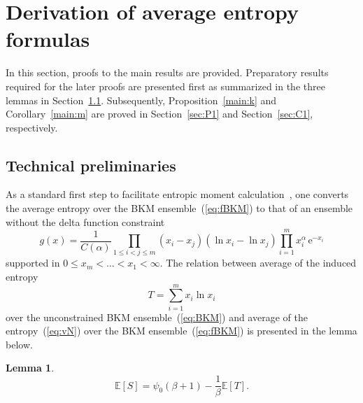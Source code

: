 \documentclass[pdflatex,sn-mathphys-num]{sn-jnl}%
\theoremstyle{thmstyleone}
\newtheorem{lemma}{Lemma}
\newcommand{\ee}{\,\mathrm{e}}
\begin{document}
\section{Derivation of average entropy formulas}\label{sec:proof}
In this section, proofs to the main results are provided. Preparatory results required for the later proofs are presented first as summarized in the three lemmas in Section~\ref{sec:aux}. Subsequently, Proposition~\ref{main:k} and Corollary~\ref{main:m} are proved in Section~\ref{sec:P1} and Section~\ref{sec:C1}, respectively.

\subsection{Technical preliminaries}\label{sec:aux}
As a standard first step to facilitate entropic moment calculation~\cite{Foong94,HWC21,HW25,Page93,Ruiz95,Kumar19,VPO16,Wei17,Wei20,Wei20BHA,Wei20BH,Wei23,Wei26,WHW25,WHW26}, one converts the average entropy over the BKM ensemble~(\ref{eq:fBKM}) to that of an ensemble without the delta function constraint
\begin{equation}\label{eq:BKM}
g(x)=\frac{1}{C(\alpha)}\prod_{1\leq i<j\leq m}\left(x_{i}-x_{j}\right)\left(\ln x_{i}-\ln x_{j}\right)\prod_{i=1}^{m}x_{i}^{\alpha}\ee^{-x_{i}}
\end{equation}
supported in $0\leq x_{m}<\dots<x_{1}<\infty$. The relation between average of the induced entropy
\begin{equation}\label{eq:TvN}
T=\sum_{i=1}^{m}x_{i}\ln x_{i}
\end{equation}
over the unconstrained BKM ensemble~(\ref{eq:BKM}) and average of the entropy~(\ref{eq:vN}) over the BKM ensemble~(\ref{eq:fBKM}) is presented in the lemma below.
\begin{lemma}\label{l:f}
\begin{equation}\label{eq:ST}
\mathbb{E}\left[S\right]=\psi_{0}(\beta+1)-\frac{1}{\beta}\mathbb{E}\left[T\right].
\end{equation}
\end{lemma}
\end{document}
